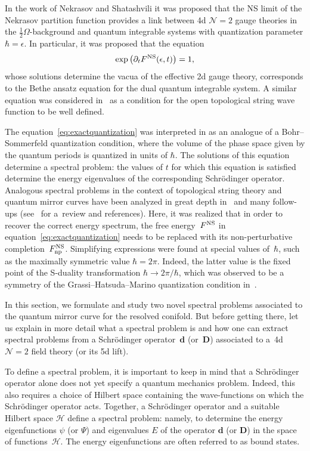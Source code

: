 \documentclass[pdftex]{sigma}
\numberwithin{equation}{section}
\begin{document}
In the work of Nekrasov and Shatashvili \cite{NS} it was proposed that the NS limit of the Nekrasov partition function provides a link between 4d $\mathcal{N}=2$ gauge theories in the $\frac{1}{2}\Omega$-background and quantum integrable systems with quantization parameter $\hbar = \epsilon$. In particular, it was proposed that the equation
\begin{equation}\label{eq:exactquantization}
 \exp\big(\partial_t F^{\rm NS}(\epsilon,t)\big) = 1,
\end{equation}
whose solutions determine the vacua of the effective 2d gauge theory, corresponds to the Bethe ansatz equation for the dual quantum integrable system. A similar equation was considered in~\cite{ACDKV} as a condition for the open topological string wave function to be well defined.

The equation~\eqref{eq:exactquantization} was interpreted in \cite{Mironov:2009uv} as an analogue of a Bohr--Sommerfeld quantization condition, where the volume of the phase space given by the quantum periods is quantized in units of $\hbar$. The solutions of this equation determine a spectral problem: the values of $t$ for which this equation is satisfied determine the energy eigenvalues of the corresponding Schr\"odinger operator. Analogous spectral problems in the context of topological string theory and quantum mirror curves have been analyzed in great depth in~\cite{GHM} and many follow-ups (see~\cite{MarinoSpectral} for a~review and references). Here, it was realized that in order to recover the correct energy spectrum, the free energy~$F^{\rm NS}$ in equation~\eqref{eq:exactquantization} needs to be replaced with its non-perturbative completion~$F^{\rm NS}_\mathrm{np}$. Simplifying expressions were found at special values of~$\hbar$, such as the maximally symmetric value $\hbar=2\pi$. Indeed, the latter value is the fixed point of the S-duality transformation $\hbar \rightarrow 2\pi/\hbar$, which was observed to be a symmetry of the Grassi--Hatsuda--Marino quantization condition in~\cite{Hatsuda:2015fxa,Wang:2015wdy}.

In this section, we formulate and study two novel spectral problems associated to the quantum mirror curve for the resolved conifold. But before getting there, let us explain in more detail what a spectral problem is and how one can extract spectral problems from a Schr\"odinger operator~$\mathbf{d}$ (or~$\mathbf{D}$) associated to a~4d $\mathcal{N}=2$ field theory (or its 5d lift).

To define a spectral problem, it is important to keep in mind that a Schr\"odinger operator alone does not yet specify a quantum mechanics problem. Indeed, this also requires a choice of Hilbert space containing the wave-functions on which the Schr\"odinger operator acts. Together, a Schr\"odinger operator and a suitable Hilbert space $\mathcal{H}$ define a spectral problem: namely, to determine the energy eigenfunctions $\psi$ (or $\Psi$) and eigenvalues $E$ of the operator $\mathbf{d}$ (or $\mathbf{D}$) in the space of functions~$\mathcal{H}$. The energy eigenfunctions are often referred to as bound states.
\end{document}
